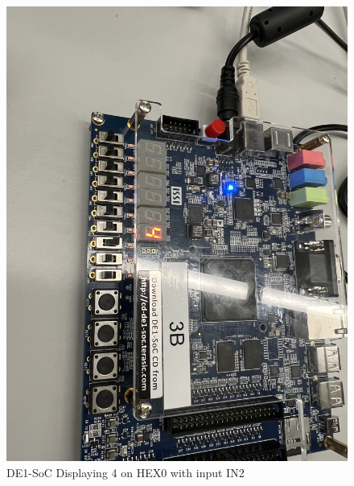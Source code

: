 \documentclass[
	letterpaper, %
	10pt, %
]{CSUniSchoolLabReport}
\begin{document}
\begin{figure}[H]
  \centering
  \includegraphics[width=.9\textwidth]{Figures/Disp_4.jpg}
  \caption{DE1-SoC Displaying 4 on HEX0 with input IN2}
  \label{fig:7}
\end{figure}
\end{document}
